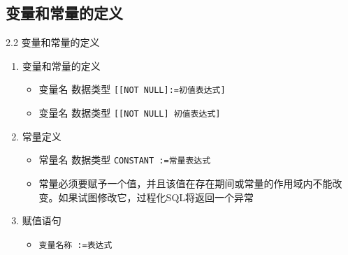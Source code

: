 \subsection{变量和常量的定义}
\begin{frame}{2.2 变量和常量的定义}
\begin{enumerate}
    \item 变量和常量的定义
    \begin{itemize}
        \item 变量名 数据类型 \lstinline{[[NOT NULL]:=初值表达式]}
        \item 变量名 数据类型 \lstinline{[[NOT NULL] 初值表达式]}
    \end{itemize}
    \item 常量定义
    \begin{itemize}
        \item 常量名 数据类型 \lstinline{CONSTANT :=常量表达式}
        \item 常量必须要赋予一个值，并且该值在存在期间或常量的作用域内不能改变。如果试图修改它，过程化SQL将返回一个异常
    \end{itemize}
    \item 赋值语句
    \begin{itemize}
    \item \lstinline{变量名称 :=表达式}
    \end{itemize}
\end{enumerate}
\end{frame}



